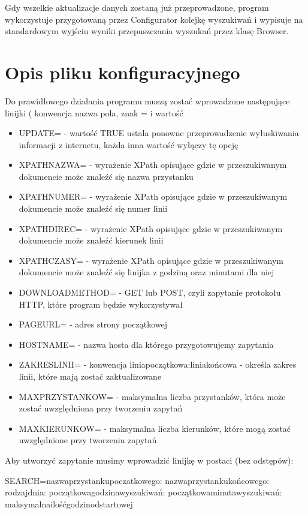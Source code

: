 \documentclass{article}
\begin{document}
Gdy wszelkie aktualizacje danych zostaną już przeprowadzone, program wykorzystuje przygotowaną przez Configurator kolejkę wyszukiwań i wypisuje na standardowym wyjściu wyniki przepuszczania wyszukań przez klasę Browser.

\section{Opis pliku konfiguracyjnego}
Do prawidłowego działania programu muszą zostać wprowadzone następujące linijki ( konwencja nazwa pola, znak = i wartość

\begin{itemize}
\item UPDATE= - wartość TRUE ustala ponowne przeprowadzenie wyłuskiwania informacji z internetu, każda inna wartość wyłączy tę opcję
\item XPATHNAZWA= - wyrażenie XPath opisujące gdzie w przeszukiwanym dokumencie może znaleźć się nazwa przystanku
\item XPATHNUMER= - wyrażenie XPath opisujące gdzie w przeszukiwanym dokumencie może znaleźć się numer linii
\item XPATHDIREC= - wyrażenie XPath opisujące gdzie w przeszukiwanym dokumencie może znaleźć kierunek linii
\item XPATHCZASY= - wyrażenie XPath opisujące gdzie w przeszukiwanym dokumencie może znaleźć się linijka z godziną oraz minutami dla niej
\item DOWNLOADMETHOD= - GET lub POST, czyli zapytanie protokołu HTTP, które program będzie wykorzystywał
\item PAGEURL= - adres strony początkowej
\item HOSTNAME= - nazwa hosta dla którego przygotowujemy zapytania
\item ZAKRESLINII= - konwencja liniapoczątkowa:liniakońcowa - określa zakres linii, które mają zostać zaktualizowane
\item MAXPRZYSTANKOW= - maksymalna liczba przystanków, która może zostać uwzględniona przy tworzeniu zapytań
\item MAXKIERUNKOW= - maksymalna liczba kierunków, które mogą zostać uwzględnione przy tworzeniu zapytań
\end{itemize}

Aby utworzyć zapytanie musimy wprowadzić linijkę w postaci (bez odstępów):

SEARCH=nazwaprzystankupoczatkowego: nazwaprzystankukońcowego: rodzajdnia: początkowagodzinawyszukiwań: początkowaminutawyszukiwań: maksymalnailośćgodzinodstartowej
\end{document}
